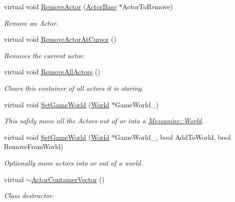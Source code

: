 \begin{DoxyCompactItemize}
virtual void \hyperlink{classMezzanine_1_1ActorContainerVector_ab0f76ee775a4e92a55835e07edac0bce}{RemoveActor} (\hyperlink{classMezzanine_1_1ActorBase}{ActorBase} $\ast$ActorToRemove)
\begin{DoxyCompactList}\small\item\em Remove an Actor. \item\end{DoxyCompactList}\item 
virtual void \hyperlink{classMezzanine_1_1ActorContainerVector_a380140962919b31d8c2b23be6f69fbb0}{RemoveActorAtCursor} ()
\begin{DoxyCompactList}\small\item\em Removes the current actor. \item\end{DoxyCompactList}\item 
\hypertarget{classMezzanine_1_1ActorContainerVector_ae34237a2ba5649f00c45e87b8d570097}{
virtual void \hyperlink{classMezzanine_1_1ActorContainerVector_ae34237a2ba5649f00c45e87b8d570097}{RemoveAllActors} ()}
\label{classMezzanine_1_1ActorContainerVector_ae34237a2ba5649f00c45e87b8d570097}

\begin{DoxyCompactList}\small\item\em Clears this container of all actors it is storing. \item\end{DoxyCompactList}\item 
virtual void \hyperlink{classMezzanine_1_1ActorContainerVector_ab974d2704bfc3d74e3f008250ed893d8}{SetGameWorld} (\hyperlink{classMezzanine_1_1World}{World} $\ast$GameWorld\_\-)
\begin{DoxyCompactList}\small\item\em This safely move all the Actors out of or into a \hyperlink{classMezzanine_1_1World}{Mezzanine::World}. \item\end{DoxyCompactList}\item 
virtual void \hyperlink{classMezzanine_1_1ActorContainerVector_a7011795fcc3c3eb51b981aaebff23fac}{SetGameWorld} (\hyperlink{classMezzanine_1_1World}{World} $\ast$GameWorld\_\-, bool AddToWorld, bool RemoveFromWorld)
\begin{DoxyCompactList}\small\item\em Optionally move actors into or out of a world. \item\end{DoxyCompactList}\item 
\hypertarget{classMezzanine_1_1ActorContainerVector_a84a9f721addd5bdfbc611393913e68fd}{
virtual \hyperlink{classMezzanine_1_1ActorContainerVector_a84a9f721addd5bdfbc611393913e68fd}{$\sim$ActorContainerVector} ()}
\label{classMezzanine_1_1ActorContainerVector_a84a9f721addd5bdfbc611393913e68fd}

\begin{DoxyCompactList}\small\item\em Class destructor. \item\end{DoxyCompactList}\end{DoxyCompactItemize}
